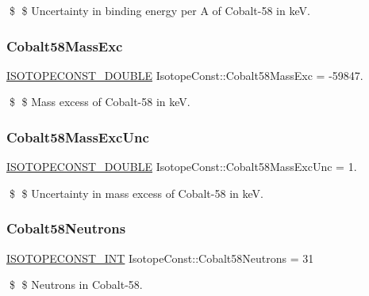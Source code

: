 \$ \$ Uncertainty in binding energy per A of Cobalt-\/58 in keV. \mbox{\label{group___isotope_const-_cobalt-_co58_ga2df85e424a51ef4a3ef4eb130fbebcad}} 
\subsubsection{\texorpdfstring{Cobalt58\+Mass\+Exc}{Cobalt58MassExc}}
{\footnotesize\ttfamily \mbox{\hyperlink{group___isotope_const-_macros_ga8f45a7272ce02c0b4c65c44636ed719a}{I\+S\+O\+T\+O\+P\+E\+C\+O\+N\+S\+T\+\_\+\+D\+O\+U\+B\+LE}} Isotope\+Const\+::\+Cobalt58\+Mass\+Exc = -\/59847.}

\$ \$ Mass excess of Cobalt-\/58 in keV. \mbox{\label{group___isotope_const-_cobalt-_co58_ga8bee573b95a034c4e35aa35e0a0cf47a}} 
\subsubsection{\texorpdfstring{Cobalt58\+Mass\+Exc\+Unc}{Cobalt58MassExcUnc}}
{\footnotesize\ttfamily \mbox{\hyperlink{group___isotope_const-_macros_ga8f45a7272ce02c0b4c65c44636ed719a}{I\+S\+O\+T\+O\+P\+E\+C\+O\+N\+S\+T\+\_\+\+D\+O\+U\+B\+LE}} Isotope\+Const\+::\+Cobalt58\+Mass\+Exc\+Unc = 1.}

\$ \$ Uncertainty in mass excess of Cobalt-\/58 in keV. \mbox{\label{group___isotope_const-_cobalt-_co58_ga7e83b126fd1dbba5be8dc14ce6c5a65f}} 
\subsubsection{\texorpdfstring{Cobalt58\+Neutrons}{Cobalt58Neutrons}}
{\footnotesize\ttfamily \mbox{\hyperlink{group___isotope_const-_macros_ga5f18360b3e99483a35c32d789e62621c}{I\+S\+O\+T\+O\+P\+E\+C\+O\+N\+S\+T\+\_\+\+I\+NT}} Isotope\+Const\+::\+Cobalt58\+Neutrons = 31}

\$ \$ Neutrons in Cobalt-\/58. \mbox{\label{group___isotope_const-_cobalt-_co58_ga2fbab49c0fc6bf78e8ca01ccaa4a10d2}} 
